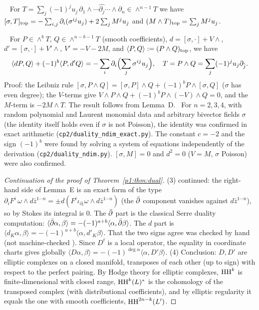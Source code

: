 \begin{lem}\tP\ \tV\label{p1:lem:D}
For $T=\sum_j(-1)^ju_j\,\partial_1\wedge\cdots\widehat{\partial_j}\cdots\wedge\partial_n\in\wedge^{n-1}T$ we have $[\sigma,T]_{\rm top}=-\sum_{i,j}\partial_i(\sigma^{ij}u_j)+2\sum_jM^ju_j$ and $(M\wedge T)_{\rm top}=\sum_jM^ju_j$.
\end{lem}
\begin{lem}\tP\ \tV\label{p1:lem:E}
For $P\in\wedge^bT$, $Q\in\wedge^{n-b-1}T$ (smooth coefficients), $d=[\sigma,\cdot]+V\wedge$, $d'=[\sigma,\cdot]+V'\wedge$, $V'=-V-2M$, and $\langle P,Q\rangle:=(P\wedge Q)_{\rm top}$, we have
\[\langle dP,Q\rangle+(-1)^b\langle P,d'Q\rangle=-\sum_i\partial_i\Bigl(\sum_j\sigma^{ij}u_j\Bigr),\quad T=P\wedge Q=\sum_j(-1)^ju_j\partial_{\hat j}.\]
Proof: the Leibniz rule $[\sigma,P\wedge Q]=[\sigma,P]\wedge Q+(-1)^bP\wedge[\sigma,Q]$ ($\sigma$ has even degree); the $V$-terms give $V\wedge P\wedge Q+(-1)^bP\wedge(-V)\wedge Q=0$, and the $M$-term is $-2M\wedge T$. The result follows from Lemma~D.
\tV\ For $n=2,3,4$, with random polynomial and Laurent monomial data and arbitrary bivector fields $\sigma$ (the identity itself holds even if $\sigma$ is not Poisson), the identity was confirmed in exact arithmetic (\texttt{cp2/duality\_ndim\_exact.py}). The constant $c=-2$ and the sign $(-1)^b$ were found by solving a system of equations independently of the derivation (\texttt{cp2/duality\_ndim.py}). $[\sigma,M]=0$ and $d^2=0$ ($V=M$, $\sigma$ Poisson) were also confirmed.
\end{lem}
\begin{proof}[Continuation of the proof of Theorem~\ref{p1:thm:dual}]
(3) continued: the right-hand side of Lemma~E is an exact form of the type $\partial_iF^i\,\omega\wedge d\bar z^{1\cdots n}=\pm d(F^i\iota_{\partial_i}\omega\wedge d\bar z^{1\cdots n})$ (the $\bar\partial$ component vanishes against $d\bar z^{1\cdots n}$), so by Stokes its integral is $0$. The $\bar\partial$ part is the classical Serre duality computation: $\langle\bar\partial\alpha,\beta\rangle=-(-1)^{a+b}\langle\alpha,\bar\partial\beta\rangle$. The $d$ part is $\langle d_K\alpha,\beta\rangle=-(-1)^{a+b}\langle\alpha,d'_K\beta\rangle$. That the two signs agree was checked by hand (not machine-checked \tQ). Since $D^t$ is a local operator, the equality in coordinate charts gives globally $\langle D\alpha,\beta\rangle=-(-1)^{\deg\alpha}\langle\alpha,D'\beta\rangle$.
(4) Conclusion: $D,D'$ are elliptic complexes on a closed manifold, transposes of each other (up to sign) with respect to the perfect pairing. By Hodge theory for elliptic complexes, $\mathrm{HH}^k$ is finite-dimensional with closed range, $\mathrm{HH}^k(L)^*$ is the cohomology of the transposed complex (with distributional coefficients), and by elliptic regularity it equals the one with smooth coefficients, $\mathrm{HH}^{2n-k}(L')$.\qedhere
\end{proof}
